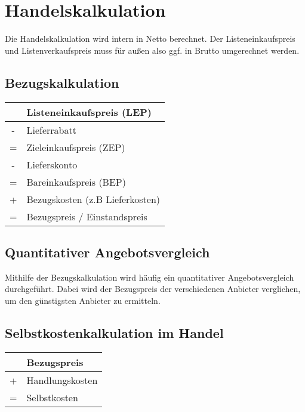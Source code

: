 \section{Handelskalkulation}

Die Handelskalkulation wird intern in Netto berechnet. Der Listeneinkaufspreis und Listenverkaufspreis muss für außen also ggf. in Brutto umgerechnet werden.

\subsection{Bezugskalkulation}

\begin{table}[H]
    \begin{tabular}{c|l}
          & Listeneinkaufspreis (LEP)       \\
        \hline
        - & Lieferrabatt                    \\
        \hline
        = & Zieleinkaufspreis (ZEP)         \\
        \hline
        - & Lieferskonto                    \\
        \hline
        = & Bareinkaufspreis (BEP)          \\
        \hline
        + & Bezugskosten (z.B Lieferkosten) \\
        \hline
        = & Bezugspreis / Einstandspreis    \\
    \end{tabular}
    \label{tab:bezugskalkulation}
\end{table}

\subsection{Quantitativer Angebotsvergleich}

Mithilfe der Bezugskalkulation wird häufig ein quantitativer Angebotsvergleich durchgeführt. Dabei wird der Bezugspreis der verschiedenen Anbieter verglichen, um den günstigsten Anbieter zu ermitteln.

\subsection{Selbstkostenkalkulation im Handel}

\begin{table}[H]
    \begin{tabular}{c|l}
          & Bezugspreis     \\
        \hline
        + & Handlungskosten \\
        \hline
        = & Selbstkosten    \\
    \end{tabular}
    \label{tab:selbstkostenkalkulation}
\end{table}

